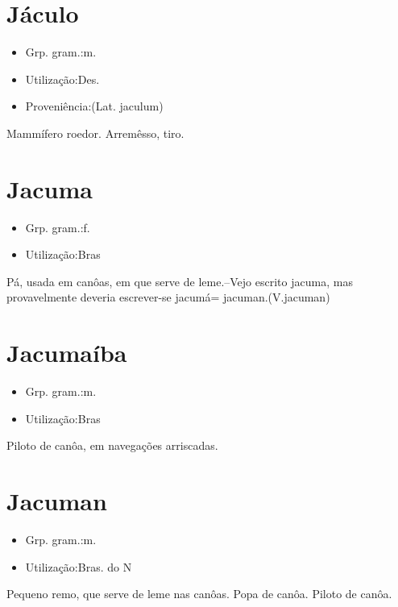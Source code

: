 \documentclass{article}
\begin{document}
\section{Jáculo}
\begin{itemize}
\item {Grp. gram.:m.}
\end{itemize}
\begin{itemize}
\item {Utilização:Des.}
\end{itemize}
\begin{itemize}
\item {Proveniência:(Lat. \textunderscore jaculum\textunderscore )}
\end{itemize}
Mammífero roedor.
Arremêsso, tiro.
\section{Jacuma}
\begin{itemize}
\item {Grp. gram.:f.}
\end{itemize}
\begin{itemize}
\item {Utilização:Bras}
\end{itemize}
Pá, usada em canôas, em que serve de leme.--Vejo escrito \textunderscore jacuma\textunderscore , mas provavelmente deveria escrever-se \textunderscore jacumá\textunderscore  = \textunderscore jacuman\textunderscore .(V.jacuman)
\section{Jacumaíba}
\begin{itemize}
\item {Grp. gram.:m.}
\end{itemize}
\begin{itemize}
\item {Utilização:Bras}
\end{itemize}
Piloto de canôa, em navegações arriscadas.
\section{Jacuman}
\begin{itemize}
\item {Grp. gram.:m.}
\end{itemize}
\begin{itemize}
\item {Utilização:Bras. do N}
\end{itemize}
Pequeno remo, que serve de leme nas canôas.
Popa de canôa.
Piloto de canôa.
\end{document}
